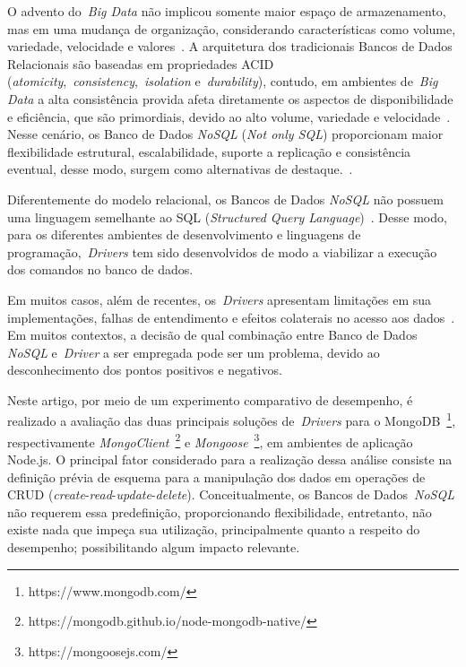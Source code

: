 \documentclass[12pt]{article}
\begin{document}
O advento do~\emph{Big Data} não implicou somente maior espaço de armazenamento, mas em uma mudança de organização, considerando características como volume, variedade, velocidade e valores~\cite{ward2013undefined}. 
A arquitetura dos tradicionais Bancos de Dados Relacionais são baseadas em propriedades ACID (\textit{atomicity},~\textit{consistency},~\textit{isolation} e~\textit{durability}), contudo, em ambientes de~\emph{Big Data} a alta consistência provida afeta diretamente os aspectos de disponibilidade e eficiência, que são primordiais, devido ao alto volume, variedade e velocidade~\cite{aparicio:2016}. 
Nesse cenário, os Banco de Dados \textit{NoSQL} (\emph{Not only SQL}) proporcionam maior flexibilidade estrutural, escalabilidade, suporte a replicação e consistência eventual, desse modo, surgem como alternativas de destaque.~\cite{han2011survey}. 
 
Diferentemente do modelo relacional, os Bancos de Dados \textit{NoSQL} não possuem uma linguagem semelhante ao SQL (\emph{Structured Query Language})~\cite{bugiotti2013object,sellami2014odbapi}. 
Desse modo, para os diferentes ambientes de desenvolvimento e linguagens de programação,~\emph{Drivers} tem sido desenvolvidos de modo a viabilizar a execução dos comandos no banco de dados. 

Em muitos casos, além de recentes, os~\emph{Drivers} apresentam limitações em sua implementações, falhas de entendimento e efeitos colaterais no acesso aos dados~\cite{rafique:2018}. 
Em muitos contextos, a decisão de qual combinação entre Banco de Dados \textit{NoSQL} e~\emph{Driver} a ser empregada pode ser um problema, devido ao desconhecimento dos pontos positivos e negativos.

Neste artigo, por meio de um experimento comparativo de desempenho, é realizado a avaliação das duas principais soluções de~\emph{Drivers} para o MongoDB~\footnote{https://www.mongodb.com/}, respectivamente \emph{MongoClient}~\footnote{https://mongodb.github.io/node-mongodb-native/} e \emph{Mongoose}~\footnote{https://mongoosejs.com/}, em ambientes de aplicação Node.js. 
O principal fator considerado para a realização dessa análise consiste na definição prévia de esquema para a manipulação dos dados em operações de CRUD (\emph{create}-\emph{read}-\emph{update}-\emph{delete}). Conceitualmente, os Bancos de Dados~\textit{NoSQL} não requerem essa predefinição, proporcionando flexibilidade, entretanto, não existe nada que impeça sua utilização, principalmente quanto a respeito do desempenho; possibilitando algum impacto relevante.
\end{document}
